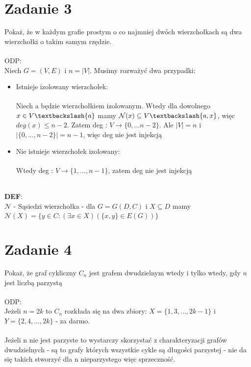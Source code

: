 \documentclass{article}
\begin{document}
\section{\centering Zadanie 3}
Pokaż, że w każdym grafie prostym o co najmniej dwóch wierzchołkach są dwa wierzchołki o takim samym rzędzie. \\\\
ODP:\\
Niech $G = (V,E)$ i $n = |V|$. Musimy rozważyć dwa przypadki:\\
\begin{itemize}
	\item Istnieje izolowany wierzchołek: \\\\ Niech a będzie wierzchołkiem izolowanym. Wtedy dla dowolnego $x \in V \textbackslash \{a\}$ mamy $\mathcal{N}(x)  \subseteq V \textbackslash \{a,x\}$, więc $deg(x) \leq n-2$. Zatem deg : $V \rightarrow \{0,...n-2\}$. Ale $|V| =n$ i $|\{0,...,n-2\}| = n-1$, więc deg nie jest injekcją
	\item Nie istnieje wierzchołek izolowany: \\\\ Wtedy deg : $V \rightarrow \{1,...,n-1\}$, zatem deg nie jest injekcją\\\\
\end{itemize}
\noindent \textbf{DEF}:\\
\textbf{$\mathcal{N}$} - Sąsiedzi wierzchołka - dla $G = G(D,C)$ i $X \subseteq D$ mamy $\mathcal{N}(X) = \{y \in C : (\exists x \in X)(\{x,y\} \in E(G))\}$\\
\section{\centering Zadanie 4}
Pokaż, że graf cykliczny $C_{n}$ jest grafem dwudzielnym wtedy i tylko wtedy, gdy $n$ jest liczbą parzystą \\\\
ODP:\\
Jeżeli $n = 2k$ to $C_{n}$ rozkłada się na dwa zbiory: $X = \{1,3,...,2k-1\}$ i $Y = \{2,4,...,2k\}$ - za darmo.\\\\
Jeżeli n nie jest parzyste to wystarczy skorzystać z charakteryzacji grafów dwudzielnych - są to grafy których wszystkie cykle są długości parzystej - nie da się takich stworzyć dla n nieparzystego więc sprzeczność.
\end{document}
